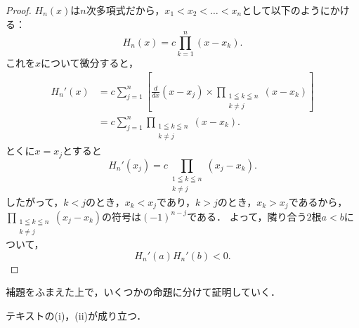 \begin{proof}
    $H_n (x)$は$n$次多項式だから，$x_1 < x_2 < \dots <x_n$として以下のようにかける：
    \[
        H_n (x) = c \prod_{k=1}^{n} (x-x_k).
    \]
    これを$x$について微分すると，
    \begin{align*}
        H_n '(x) & = c \sum_{j=1}^{n} \left[ \frac{d}{dx} (x-x_j) \times  \prod_{\substack{1 \leqq k \leqq n \\ k \ne j}} (x-x_k) \right] \\
                 & = c \sum_{j=1}^{n} \prod_{\substack{1 \leqq k \leqq n                                     \\ k \ne j}} (x-x_k).
    \end{align*}
    とくに$x = x_j$とすると
    \[
        H_n '(x_j) = c \prod_{\substack{1 \leqq k \leqq n \\ k \ne j}} (x_j-x_k).
    \]
    したがって，$k <j$のとき，$x_k < x_j$であり，$k > j$のとき，$x_k > x_j$であるから，
    $\prod_{\substack{1 \leqq k \leqq n \\ k \ne j}} (x_j-x_k)$の符号は$(-1)^{n-j}$である．
    よって，隣り合う$2$根$a < b$について，
    \[
        H_n '(a) H_n ' (b)<0.
    \]
\end{proof}

補題をふまえた上で，いくつかの命題に分けて証明していく．

\begin{proposition}{}{}
    テキストの(i)，(ii)が成り立つ．
\end{proposition}


